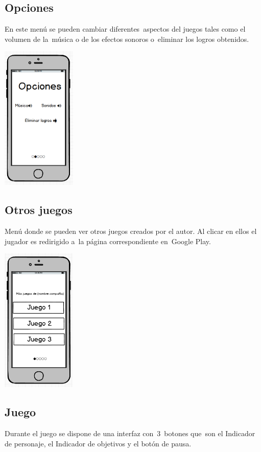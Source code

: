 \subsection[Opciones]{ Opciones}
\hypertarget{Toc484614219}{}{
En este men\'u se pueden cambiar diferentes\ aspectos del juegos tales como el volumen de la\ m\'usica o de los efectos
sonoros o\ eliminar los logros obtenidos.}

 \includegraphics[width=1.3923in,height=2.72745in]{anexos/GDD/GDD-img005.png} 

\subsection[Otros juegos]{ Otros juegos}
\hypertarget{Toc484614220}{}{
Men\'u donde se pueden ver otros juegos creados por el autor. Al clicar en ellos el jugador es redirigido a\ la p\'agina
correspondiente en\ Google Play.}

 \includegraphics[width=1.38953in,height=2.73205in]{anexos/GDD/GDD-img006.png} 

\subsection[Juego]{ Juego}
\label{mockupsJuego}
\hypertarget{Toc484614221}{}{
Durante el juego se dispone de una interfaz con\ 3\ botones que\ son el Indicador de personaje, el Indicador de
objetivos y el bot\'on de pausa.}

